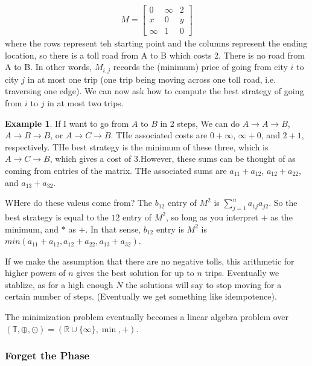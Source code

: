 \documentclass[11pt]{article}
\theoremstyle{definition}
\newtheorem{protoexample}{Example}[section]
\newenvironment{ex}
   {\begin{protoexample}}
   {\end{protoexample}}
\def\RR{{\mathbb R}}
\begin{document}
\begin{align*}
    M= \begin{bmatrix}
        0 & \infty & 2
        \\
        x & 0 & y
        \\
        \infty & 1 & 0
    \end{bmatrix}
\end{align*}
where the rows represent teh starting point and the columns represent the ending location, so there is a toll road from A to B which costs 2. There is no road from A to B. In other words, $M_{i,j}$ records the (minimum) price of going from city $i$ to city $j$ in at most one trip (one trip being moving across one toll road, i.e. traversing one edge). We can now ask how to compute the best strategy of going from $i$ to $j$ in at most two trips.

\begin{ex}
    If I want to go from $A$ to $B$ in 2 steps, We can do $A \rightarrow A \rightarrow B$, $A \rightarrow B \rightarrow B$, or $A \rightarrow C \rightarrow B$. THe associated costs are $0+\infty$, $\infty + 0$, and $2 + 1$, respectively. THe best strategy is the minimum of these three, which is $A \rightarrow C \rightarrow B$, which gives a cost of $3$.However, these sums can be thought of as coming from entries of the matrix. THe associated sums are $a_{11}+a_{12}$, $a_{12}+a_{22}$, and $a_{13}+a_{32}$. 


    WHere do these valeus come from? The $b_{12}$ entry of $M^2$ is $\sum\limits_{j=1}^n a_{1j}a_{j2}$. So the best strategy is equal to the $12$ entry of $M^2$, so long as you interpret $+$ as the minimum, and $*$ as $+$. In that sense, $b_{12}$ entry is $M^2$ is $min(a_{11}+a_{12}, a_{12} +a_{22}, a_{13}+a_{32})$. 



    If we make the assumption that there are no negative tolls, this arithmetic for higher powers of $n$ gives the best solution for up to $n$ trips. Eventually we stablize, as for a high enough $N$ the solutions will say to stop moving for a certain number of steps. (Eventually we get something like idempotence).
\end{ex}


The minimization problem eventually becomes a linear algebra problem over $(\mathbb{T}, \oplus, \odot) = ( \RR \cup \{\infty\}, \min, +)$.


\subsubsection{Forget the Phase}
\end{document}

